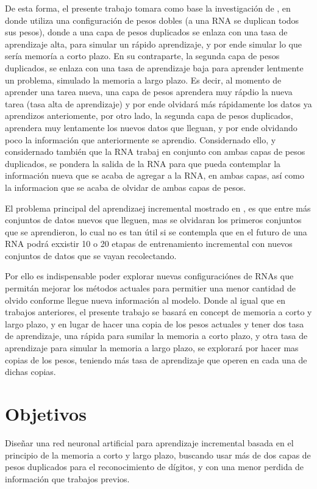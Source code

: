 De esta forma, el presente trabajo tomara como base la investigación de \cite{bullinaria2009}, en donde utiliza una configuración de pesos dobles (a una RNA se duplican todos sus pesos), donde a una capa de pesos duplicados se enlaza con una tasa de aprendizaje alta, para simular un rápido aprendizaje, y por ende simular lo que sería memoría a corto plazo. En su contraparte, la segunda capa de pesos duplicados, se enlaza con una tasa de aprendizaje baja para aprender lentmente un problema, simulado la memoria a largo plazo.  Es decir, al momento de aprender una tarea nueva,  una capa de pesos aprendera muy rápdio la nueva tarea (tasa alta de aprendizaje) y por ende olvidará más rápidamente los datos ya aprendizos anteriomente, por otro lado, la segunda capa de pesos duplicados, aprendera muy lentamente los nuevos datos que lleguan, y por ende olvidando poco la información que anteriormente se aprendio.  Considernado ello, y considernado también que la RNA trabaj en conjunto con ambas capas de pesos duplicados, se pondera la salida de la RNA para que pueda contemplar la información nueva que se acaba de agregar a la RNA, en ambas capas, así como la informacion que se acaba de olvidar de ambas capas de pesos.

El problema principal del aprendizaej incremental mostrado en \cite{bullinaria2009}, es que entre más conjuntos de datos nuevos que lleguen,  mas se olvidaran los primeros conjuntos que se aprendieron, lo cual no es tan útil si se contempla que en el futuro de una RNA podrá exxistir 10 o 20 etapas de entrenamiento incremental con nuevos conjuntos de datos que se vayan recolectando.

Por ello es indispensable poder explorar nuevas configuraciónes de RNAs que permitán mejorar los métodos actuales para permitier una menor cantidad de olvido conforme llegue nueva información al modelo. Donde al igual que en trabajos anteriores,  el presente trabajo se basará en concept de memoria a corto y largo plazo,  y en lugar de hacer una copia de los pesos actuales y tener dos tasa de aprendizaje, una rápida para sumilar la memoria a corto plazo, y otra tasa de aprendizaje para simular la memoria a largo plazo, se explorará por hacer mas copias de los pesos,  teniendo más tasa de aprendizaje que operen en cada una de dichas copias.
    
\section{Objetivos}
    Diseñar una red neuronal artificial para aprendizaje incremental basada en el principio de la memoria a corto y largo plazo, buscando usar más de dos capas de pesos duplicados para el reconocimiento de dígitos, y con una menor perdida de información que trabajos previos.
